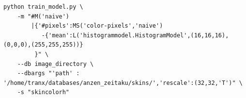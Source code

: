 \documentclass{report}
\begin{document}
\begin{lstlisting}
python train_model.py \
    -m "#M('naive')
        |{'#pixels':MS('color-pixels','naive')  
           -{'mean':L('histogrammodel.HistogramModel',(16,16,16),(0,0,0),(255,255,255))}
         }" \
    --db image_directory \
    --dbargs "'path' : '/home/tranx/databases/anzen_zeitaku/skins/','rescale':(32,32,'T')" \
    -s "skincolorh" 

\end{lstlisting}
\end{document}
